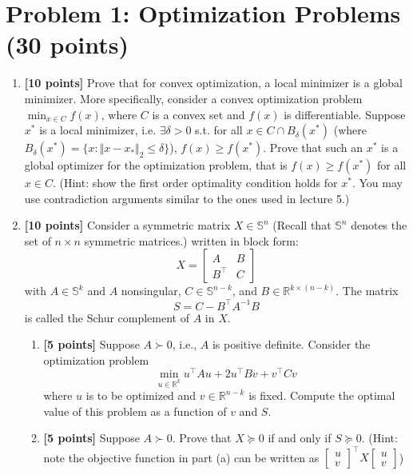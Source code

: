 \documentclass{article}
\begin{document}


\newpage
\section*{Problem 1: Optimization Problems (30 points)}
\begin{enumerate}
\item \textbf{[10 points]} Prove that for convex optimization, a local minimizer is a global minimizer. More specifically, consider a convex optimization problem $\min_{x\in C} f(x)$, where $C$ is a convex set and $f(x)$ is differentiable. Suppose $x^*$ is a local minimizer, i.e. $\exists \delta>0$ s.t. for all $x \in C\cap B_\delta(x^*)$ (where $B_\delta(x^*) = \{ x:\Vert x-x_*\Vert_2 \leq \delta\}$), $f(x)\geq f(x^*)$. Prove that such an $x^*$ is a global optimizer for the optimization problem, that is $f(x)\geq f(x^*) $ for all $x\in C$. (Hint: show the first order optimality condition holds for $x^*$. You may use contradiction arguments similar to the ones used in lecture 5.)
	    \begin{tcolorbox}
	\end{tcolorbox}
\item  \textbf{[10 points]} Consider a symmetric matrix $X \in \mathbb S^n$ (Recall that $\mathbb S^n$ denotes the set of $n\times n$ symmetric matrices.) written in block form:
\begin{equation*}
X = 
\begin{bmatrix}
A & B \\
B^\top  & C
\end{bmatrix}
\end{equation*}
with $A\in \mathbb S^k$ and $A$ nonsingular, $C\in\mathbb{S}^{n-k}$, and $B\in\mathbb{R}^{k\times (n-k)}$. The matrix 
$$
S = C-B^\top  A^{-1}B
$$
is called the Schur complement of $A$ in $X$. 
	\begin{enumerate}
	\item \textbf{[5 points]} Suppose $A\succ 0$, i.e., $A$ is positive definite. Consider the optimization problem
    $$
    \min_{u\in \mathbb{R}^k} u^\top  Au + 2u^\top Bv  + v^\top Cv
    $$
    where $u$ is to be optimized and $v\in \mathbb{R}^{n-k}$ is fixed. Compute the optimal value of this problem as a function of $v$ and $S$.
    \begin{tcolorbox}
	\end{tcolorbox}
	\item \textbf{[5 points]} Suppose $A \succ 0$. Prove that $X\succeq 0$ if and only if $S \succeq 0$.  (Hint: note the objective function in part (a) can be written as $\begin{bmatrix} u\\v\end{bmatrix}^\top  X \begin{bmatrix} u\\v\end{bmatrix} $)
	\begin{tcolorbox}
	\end{tcolorbox}
	\end{enumerate}



\end{enumerate}
\end{document}
